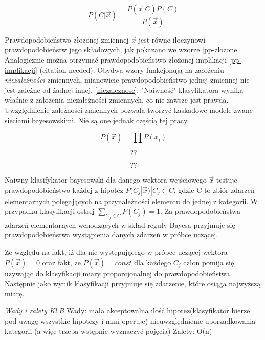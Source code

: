 \documentclass[12pt,a4paper,oneside]{report} %
\begin{document}
\begin{equation}
P(C|\vec{x}) = \frac{P(\vec{x}|C)P(C)}{P(\vec{x})}
\end{equation}

Prawdopodobieństwo złożonej zmiennej $\vec{x}$ jest równe iloczynowi prawdopodobieństw jego składowych, jak pokazano we wzorze \ref{pp-zlozone}. Analogicznie można otrzymać prawdopodobieństwo złożonej implikacji \ref{pp-implikacji} (citation needed). Obydwa wzory funkcjonują na założeniu \emph{niezależności} zmiennych, mianowicie prawdopodobieństwo jednej zmiennej nie jest zależne od żadnej innej. \ref{niezaleznosc}. "Naiwność" klasyfikatora wynika właśnie z założenia niezależności zmiennych, co nie zawsze jest prawdą. Uwzględnienie zależności zmiennych pozwala tworzyć kaskadowe modele zwane sieciami bayesowskimi.\cite{dm-cichosz} Nie są one jednak częścią tej pracy.\par

\begin{equation}
P(\vec{x}) = \prod{P(x_i)}
\end{equation}
\label{pp-zlozone}

\begin{equation}
??
\end{equation}
\label{pp-implikacji}

\begin{equation}
??
\end{equation}
\label{niezaleznosc}

Naiwny klasifykator bayesowski dla danego wektora wejściowego $\vec{x}$ testuje prawdopodobieństwo każdej z hipotez $P(C_j|\vec{x}) | C_j \in C$, gdzie C to zbiór zdarzeń elementarnych polegających na przynależności elementu do jednej z kategorii. W przypadku klasyfikacji ostrej $\sum_{C_j \in C} P(C_j) = 1 $. Za prawdopodobieństwa zdarzeń elementarnych wchodzących w skład reguły Bayesa przyjmuje się prawdopodobieństwa wystąpienia danych zdarzeń w próbce uczącej. \par

Ze względu na fakt, iż dla nie występującego w próbce uczącej wektora $P(\vec{x}) = 0$ oraz fakt, że $P(\vec{x})=const$ dla każdego $C_j$ człon pomija się, uzywając do klasyfikacji miary proporcjonalnej do prawdopodobieństwa. Następnie jako wynik klasyfikacji przyjmuje się zdarzenie, które osiąga najwyższą miarę.\par

\emph{Wady i zalety Kl.B}
Wady:
mała akceptowalna ilość hipotez(klasyfikator bierze pod uwagę wszystkie hipotezy i nimi operuje)
nieuwzględnienie uporządkowania kategorii (a więc trzeba wstępnie wyznaczyć pojęcia)
Zalety:
O(n)
\end{document}
